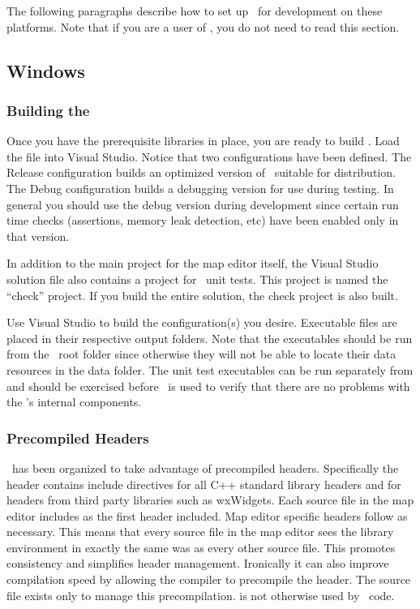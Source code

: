The following paragraphs describe how to set up \MapEditor\ for development on these platforms. Note that if you are a user of \MapEditor, you do not need to read this section.

\subsection{Windows}

\subsubsection{Building the \MapEditor}

Once you have the prerequisite libraries in place, you are ready to build \MapEditor. Load the  file into Visual Studio. Notice that two configurations have been defined. The Release configuration builds an optimized version of \MapEditor\ suitable for distribution. The Debug configuration builds a debugging version for use during testing. In general you should use the debug version during development since certain run time checks (assertions, memory leak detection, etc) have been enabled only in that version.

In addition to the main project for the map editor itself, the Visual Studio solution file also contains a project for \MapEditor\ unit tests. This project is named the ``check'' project. If you build the entire solution, the check project is also built.

Use Visual Studio to build the configuration(s) you desire. Executable files are placed in their respective output folders. Note that the executables should be run from the \MapEditor\ root folder since otherwise they will not be able to locate their data resources in the data folder. The unit test executables can be run separately from \MapEditor and should be exercised before \MapEditor\ is used to verify that there are no problems with the \MapEditor's internal components.

\subsubsection{Precompiled Headers}

\MapEditor\ has been organized to take advantage of precompiled headers. Specifically the header  contains include directives for all C++ standard library headers and for headers from third party libraries such as wxWidgets. Each source file in the map editor includes  as the first header included. Map editor specific headers follow  as necessary. This means that every source file in the map editor sees the library environment in exactly the same was as every other source file. This promotes consistency and simplifies header management. Ironically it can also improve compilation speed by allowing the compiler to precompile the  header. The source file  exists only to manage this precompilation.  is not otherwise used by \MapEditor\ code.

